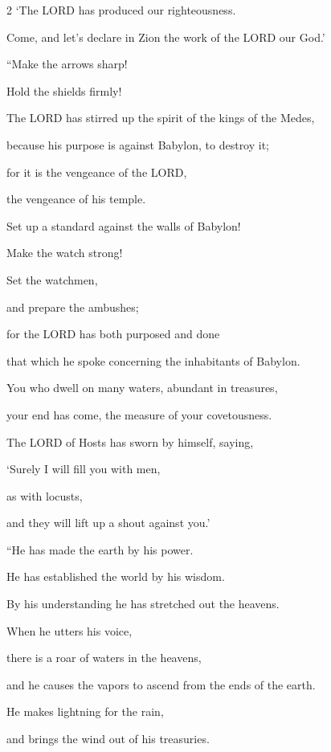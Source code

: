 \begin{multicols}{2}
\myverse{}‘The LORD has produced our righteousness.

Come, and let’s declare in Zion the work of the LORD our God.’

\vspace{\baselineskip}

\myverse{}“Make the arrows sharp!

Hold the shields firmly!

The LORD has stirred up the spirit of the kings of the Medes,

because his purpose is against Babylon, to destroy it;

for it is the vengeance of the LORD,

the vengeance of his temple.


\myverse{}Set up a standard against the walls of Babylon!

Make the watch strong!

Set the watchmen,

and prepare the ambushes;

for the LORD has both purposed and done

that which he spoke concerning the inhabitants of Babylon.


\myverse{}You who dwell on many waters, abundant in treasures,

your end has come, the measure of your covetousness.


\myverse{}The LORD of Hosts has sworn by himself, saying,

‘Surely I will fill you with men,

as with locusts,

and they will lift up a shout against you.’

\vspace{\baselineskip}

\myverse{}“He has made the earth by his power.

He has established the world by his wisdom.

By his understanding he has stretched out the heavens.


\myverse{}When he utters his voice,

there is a roar of waters in the heavens,

and he causes the vapors to ascend from the ends of the earth.

He makes lightning for the rain,

and brings the wind out of his treasuries.

\vspace{\baselineskip}


\end{multicols}
